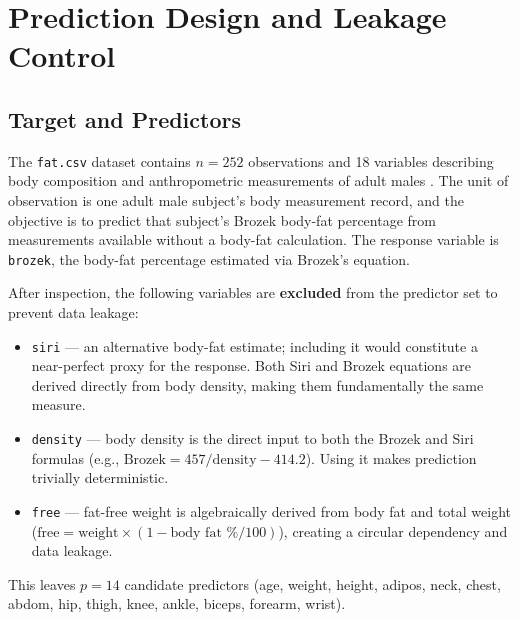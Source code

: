 \section{Prediction Design and Leakage Control}
\label{sec:prediction-design}

\subsection{Target and Predictors}
\label{sec:target-predictors}

The \texttt{fat.csv} dataset contains $n = 252$ observations and 18 variables
describing body composition and anthropometric measurements of adult males
\citep{Johnson1996}.  The unit of observation is one adult male subject's body
measurement record, and the objective is to predict that subject's Brozek
body-fat percentage from measurements available without a body-fat calculation.
The response variable is \texttt{brozek}, the body-fat percentage estimated via
Brozek's equation.

After inspection, the following variables are \textbf{excluded} from the
predictor set to prevent data leakage:
%
\begin{itemize}
    \item \texttt{siri} — an alternative body-fat estimate; including it would
          constitute a near-perfect proxy for the response. Both Siri and Brozek equations are derived directly from body density, making them fundamentally the same measure.
    \item \texttt{density} — body density is the direct input to both the Brozek
          and Siri formulas (e.g., $\text{Brozek} = 457 / \text{density} - 414.2$). Using it makes prediction trivially deterministic.
    \item \texttt{free} — fat-free weight is algebraically derived from body fat
          and total weight ($\text{free} = \text{weight} \times (1 - \text{body fat \%} / 100)$), creating a circular dependency and data leakage.
\end{itemize}

This leaves $p = 14$ candidate predictors (age, weight, height, adipos, neck,
chest, abdom, hip, thigh, knee, ankle, biceps, forearm, wrist).

